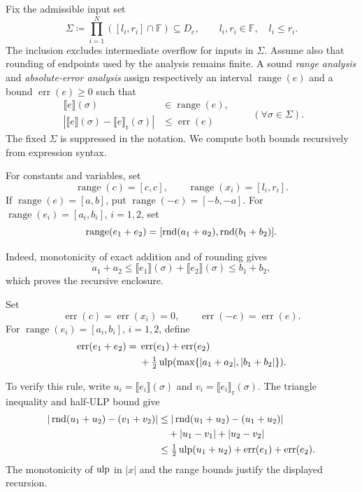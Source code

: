 \begin{definition}
Fix the admissible input set
\[
 \Sigma\coloneqq\prod_{i=1}^N([l_i, r_i]\cap\mathbb F)
 \subseteq D_e,
 \qquad l_i, r_i\in\mathbb F, \quad l_i\le r_i.
\]
The inclusion excludes intermediate overflow for inputs in
$\Sigma$. Assume also that rounding of endpoints used by
the analysis remains finite. A sound \emph{range analysis}
and \emph{absolute-error analysis} assign respectively an
interval $\operatorname{range}(e)$ and a bound
$\operatorname{err}(e)\ge0$ such that
\[
 \begin{aligned}
 \llbracket e\rrbracket(\sigma)&\in\operatorname{range}(e), \\
 |\llbracket e\rrbracket(\sigma)-\llbracket e\rrbracket_{\mathrm r}(\sigma)|
 &\le\operatorname{err}(e)
 \end{aligned}
 \qquad(\forall\sigma\in\Sigma).
\]
The fixed $\Sigma$ is suppressed in the notation.
We compute both bounds recursively from expression syntax.
\end{definition}

\begin{definition}
For constants and variables, set
\[
 \operatorname{range}(c)=[c, c], \qquad
 \operatorname{range}(x_i)=[l_i, r_i].
\]
If $\operatorname{range}(e)=[a, b]$, put
$\operatorname{range}(-e)=[-b, -a]$.
For $\operatorname{range}(e_i)=[a_i, b_i]$, $i=1, 2$, set
\[
 \operatorname{range}(e_1+e_2)
 =[\operatorname{rnd}(a_1+a_2), \operatorname{rnd}(b_1+b_2)].
\]
\end{definition}
Indeed, monotonicity of exact addition and of rounding gives
\[
 a_1+a_2\le
 \llbracket e_1\rrbracket(\sigma)+\llbracket e_2\rrbracket(\sigma)
 \le b_1+b_2,
\]
which proves the recursive enclosure.

\begin{definition}
Set
\[
 \operatorname{err}(c)=\operatorname{err}(x_i)=0,
 \qquad\operatorname{err}(-e)=\operatorname{err}(e).
\]
For $\operatorname{range}(e_i)=[a_i, b_i]$, $i=1, 2$, define
\[
 \begin{aligned}
 \operatorname{err}(e_1+e_2)
 ={}&\operatorname{err}(e_1)+\operatorname{err}(e_2)\\
 &+\tfrac12\operatorname{ulp}(\max\{|a_1+a_2|, |b_1+b_2|\}).
 \end{aligned}
\]
\end{definition}
To verify this rule, write
$u_i=\llbracket e_i\rrbracket(\sigma)$ and
$v_i=\llbracket e_i\rrbracket_{\mathrm r}(\sigma)$.
The triangle inequality and half-ULP bound give
\[
 \begin{aligned}
 |\operatorname{rnd}(u_1+u_2)-(v_1+v_2)|
 &\le|\operatorname{rnd}(u_1+u_2)-(u_1+u_2)|\\
 &\quad+|u_1-v_1|+|u_2-v_2|\\
 &\le\tfrac12\operatorname{ulp}(u_1+u_2)
 +\operatorname{err}(e_1)+\operatorname{err}(e_2).
 \end{aligned}
\]
The monotonicity of $\operatorname{ulp}$ in $|x|$ and the range bounds
justify the displayed recursion.

